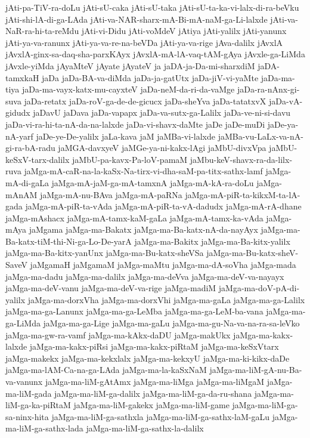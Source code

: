 {jAti-pa-TiV-ra-doLu
jAti-sU-caka
jAti-sU-taka
jAti-sU-ta-ka-vi-lalx-di-ra-beVku
jAti-shi-lA-di-ga-LAda
jAti-va-NAR-sharx-mA-Bi-mA-naM-ga-Li-lalxde
jAti-va-NaR-ra-hi-ta-reMdu
jAti-vi-Didu
jAti-voMdeV
jAtiya
jAti-yalilx
jAti-yanunx
jAti-ya-va-ranunx
jAti-ya-va-re-na-beVDa
jAti-ya-va-rige
jAva-dalilx
jAvxlA
jAvxlA-ginx-sa-daq-sha-parxKAyx
jAvxlA-mA-lA-vaq-tAM-gAya
jAvxle-ga-LiMda
jAvxle-yiMda
jAyaMteV
jAyate
jAyateV
ja
jaDA-ja-Da-mi-sharxdiM
jaDA-tamxkaH
jaDa
jaDa-BA-va-diMda
jaDa-ja-gatUtx
jaDa-jiV-vi-yaMte
jaDa-ma-tiya
jaDa-ma-vayx-katx-mu-cayxteV
jaDa-neM-da-ri-da-vaMge
jaDa-ra-nAnx-gi-suva
jaDa-retatx
jaDa-roV-ga-de-de-gicucx
jaDa-sheYva
jaDa-tatatxvX
jaDa-vA-gidudx
jaDavU
jaDava
jaDa-vapapx
jaDa-va-sutx-ga-Lalilx
jaDa-ve-ni-si-davu
jaDa-vi-ra-hi-ta-nA-da-na-lalxde
jaDa-vi-shavx-daMte
jaDe
jaDe-muDi
jaDe-ya-nA-yarf
jaDe-ye-De-yalilx
jaLa-kava
jaM
jaMBa-vi-lalxde
jaMBa-vu-LaLx-va-nA-gi-ra-bA-radu
jaMGA-davxyeV
jaMGe-ya-ni-kakx-lAgi
jaMbU-divxVpa
jaMbU-keSxV-tarx-dalilx
jaMbU-pa-kavx-Pa-loV-pamaM
jaMbu-keV-shavx-ra-da-lilx-ruva
jaMga-mA-caR-na-la-kaSx-Na-tirx-vi-dha-saM-pa-titx-sathx-lamf
jaMga-mA-di-gaLa
jaMga-mA-jaM-ga-mA-tamxnA
jaMga-mA-kA-ra-doLu
jaMga-mAnAM
jaMga-mA-nu-BAva
jaMga-mA-paRNa
jaMga-mA-piR-ta-kikxM-ta-lA-gada
jaMga-mA-piR-ta-vAda
jaMga-mA-piR-ta-vA-dadudx
jaMga-mA-rA-dhane
jaMga-mAshacx
jaMga-mA-tamx-kaM-gaLa
jaMga-mA-tamx-ka-vAda
jaMga-mAya
jaMgama
jaMga-ma-Bakatx
jaMga-ma-Ba-katx-nA-da-nayAyx
jaMga-ma-Ba-katx-tiM-thi-Ni-ga-Lo-De-yarA
jaMga-ma-Bakitx
jaMga-ma-Ba-kitx-yalilx
jaMga-ma-Ba-kitx-yanUnx
jaMga-ma-Bu-katx-sheVSa
jaMga-ma-Bu-katx-sheV-SaveV
jaMgamaH
jaMgamaM
jaMga-maMtu
jaMga-ma-dA-soVha
jaMga-mada
jaMga-ma-dadu
jaMga-ma-dalilx
jaMga-ma-deVva
jaMga-ma-deV-va-nayayx
jaMga-ma-deV-vanu
jaMga-ma-deV-va-rige
jaMga-madiM
jaMga-ma-doV-pA-di-yalilx
jaMga-ma-dorxVha
jaMga-ma-dorxVhi
jaMga-ma-gaLa
jaMga-ma-ga-Lalilx
jaMga-ma-ga-Lanunx
jaMga-ma-ga-LeMba
jaMga-ma-ga-LeM-ba-vana
jaMga-ma-ga-LiMda
jaMga-ma-ga-Lige
jaMga-ma-gaLu
jaMga-ma-gu-Na-va-na-ra-sa-leVko
jaMga-ma-gw-ra-vamf
jaMga-ma-kAkx-daDU
jaMga-makUkx
jaMga-ma-kakx-lalxde
jaMga-ma-kakx-piRsi
jaMga-ma-kakx-piRtaM
jaMga-ma-keSxVtarx
jaMga-makekx
jaMga-ma-kekxlalx
jaMga-ma-kekxyU
jaMga-ma-ki-kikx-daDe
jaMga-ma-lAM-Ca-na-ga-LAda
jaMga-ma-la-kaSxNaM
jaMga-ma-liM-gA-nu-Ba-va-vanunx
jaMga-ma-liM-gAtAmx
jaMga-ma-liMga
jaMga-ma-liMgaM
jaMga-ma-liM-gada
jaMga-ma-liM-ga-dalilx
jaMga-ma-liM-ga-da-ru-shana
jaMga-ma-liM-ga-ka-piRtaM
jaMga-ma-liM-gakekx
jaMga-ma-liM-game
jaMga-ma-liM-ga-sa-ninx-hita
jaMga-ma-liM-ga-sathxla
jaMga-ma-liM-ga-sathx-laM-gaLu
jaMga-ma-liM-ga-sathx-lada
jaMga-ma-liM-ga-sathx-la-dalilx
}

